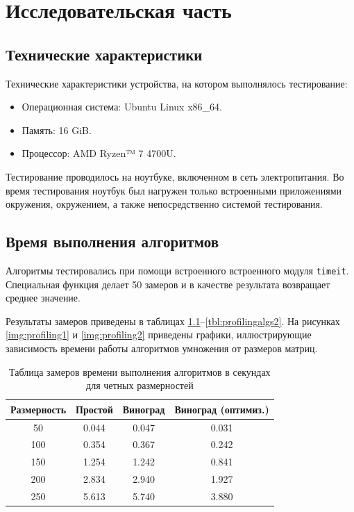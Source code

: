 \chapter{Исследовательская часть}

\section{Технические характеристики}

Технические характеристики устройства, на котором выполнялось тестирование:

\begin{itemize}
	\item Операционная система: Ubuntu\cite{ubuntu} Linux x86\_64.
	\item Память: 16 GiB.
	\item Процессор: AMD Ryzen™ 7 4700U\cite{amd}.
\end{itemize}

Тестирование проводилось на ноутбуке, включенном в сеть электропитания. Во время тестирования ноутбук был нагружен только встроенными
приложениями окружения, окружением, а также непосредственно системой тестирования.

\section{Время выполнения алгоритмов}

Алгоритмы тестировались при помощи встроенного встроенного модуля \texttt{timeit}\cite{timeit}. Специальная функция делает 50 замеров и в качестве результата возвращает среднее значение.

Результаты замеров приведены в таблицах \ref{tbl:profilingalgs1}--\ref{tbl:profilingalgs2}. На рисунках \ref{img:profiling1} и \ref{img:profiling2} 
приведены графики, иллюстрирующие зависимость времени работы алгоритмов умножения от размеров матриц.

\begin{table}[h]
	\caption{Таблица замеров времени выполнения алгоритмов в секундах для четных размерностей}
	\label{tbl:profilingalgs1}
	\begin{center}
		\begin{tabular}{|c|c|c|c|} 
		 	\hline
			Размерность & Простой & Виноград & Виноград (оптимиз.) \\  
		 	\hline
		 	50 & 0.044 & 0.047 & 0.031 \\
		 	\hline
		 	100 & 0.354 & 0.367 & 0.242 \\
		 	\hline
			150 & 1.254 & 1.242 & 0.841 \\
			\hline
			200 & 2.834 & 2.940 & 1.927 \\
			\hline
			250 & 5.613 & 5.740 & 3.880 \\
			\hline
		\end{tabular}
	\end{center}
\end{table}


